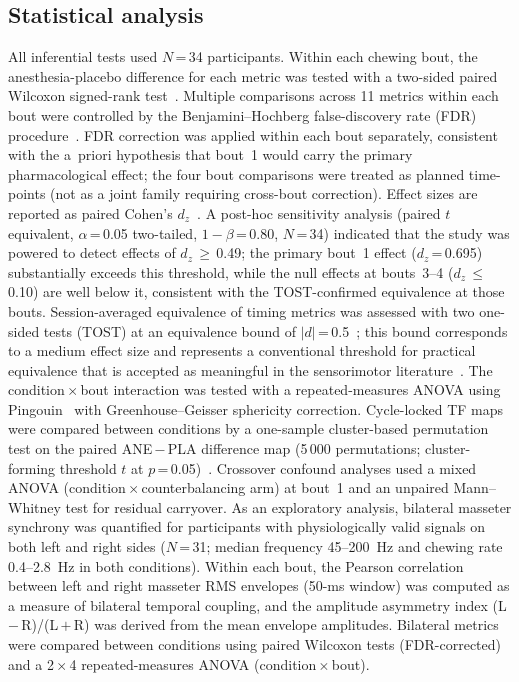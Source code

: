 \subsection*{Statistical analysis}

All inferential tests used $N$\,=\,34 participants.
Within each chewing bout, the anesthesia-placebo difference for each metric was
tested with a two-sided paired Wilcoxon signed-rank test~\cite{Pingouin}.
Multiple comparisons across 11 metrics within each bout were controlled by the
Benjamini--Hochberg false-discovery rate (FDR) procedure~\cite{Benjamini1995}.
FDR correction was applied within each bout separately, consistent with the
a~priori hypothesis that bout~1 would carry the primary pharmacological effect;
the four bout comparisons were treated as planned time-points (not as a joint
family requiring cross-bout correction).
Effect sizes are reported as paired Cohen's $d_z$~\cite{Cohen1988}.
A post-hoc sensitivity analysis (paired $t$ equivalent, $\alpha$\,=\,0.05
two-tailed, $1-\beta$\,=\,0.80, $N$\,=\,34) indicated that the study was
powered to detect effects of $d_z$\,$\geq$\,0.49; the primary bout~1 effect
($d_z$\,=\,0.695) substantially exceeds this threshold, while the null effects
at bouts~3--4 ($d_z$\,$\leq$\,0.10) are well below it, consistent with the
TOST-confirmed equivalence at those bouts.
Session-averaged equivalence of timing metrics was assessed with two one-sided
tests (TOST) at an equivalence bound of $|d|$\,=\,0.5~\cite{Lakens2017};
this bound corresponds to a medium effect size and represents a conventional
threshold for practical equivalence that is accepted as meaningful in the
sensorimotor literature~\cite{Lakens2017}.
The condition\,$\times$\,bout interaction was tested with a repeated-measures
ANOVA using Pingouin~\cite{Pingouin} with Greenhouse--Geisser sphericity
correction.
Cycle-locked TF maps were compared between conditions by a one-sample
cluster-based permutation test on the paired ANE\,$-$\,PLA difference map
(5\,000 permutations; cluster-forming threshold $t$ at $p$\,=\,0.05)~\cite{Maris2007}.
Crossover confound analyses used a mixed ANOVA (condition\,$\times$\,counterbalancing
arm) at bout~1 and an unpaired Mann--Whitney test for residual carryover.
As an exploratory analysis, bilateral masseter synchrony was quantified for
participants with physiologically valid signals on both left and right sides
($N$\,=\,31; median frequency 45--200~Hz and chewing rate 0.4--2.8~Hz in
both conditions).
Within each bout, the Pearson correlation between left and right masseter
RMS envelopes (50-ms window) was computed as a measure of bilateral temporal
coupling, and the amplitude asymmetry index (L\,$-$\,R)/(L\,$+$\,R) was
derived from the mean envelope amplitudes.
Bilateral metrics were compared between conditions using paired Wilcoxon tests
(FDR-corrected) and a 2\,$\times$\,4 repeated-measures ANOVA
(condition\,$\times$\,bout).


